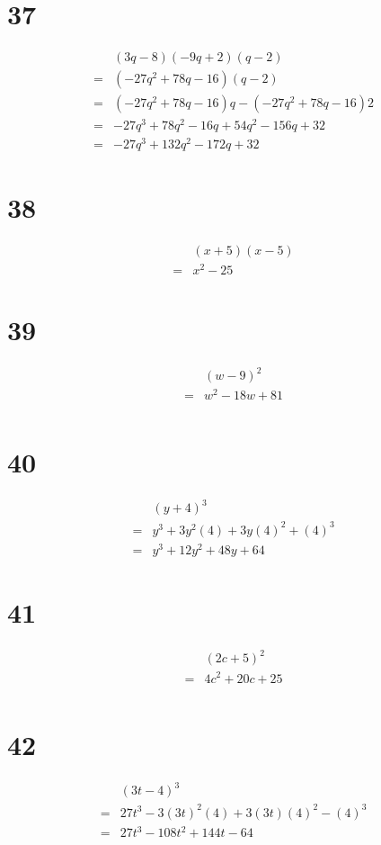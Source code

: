 \documentclass{article}
\theoremstyle{definition}
\begin{document}
\section*{37}
\[
\begin{array}{rl}
	& (3q-8)(-9q+2)(q-2) \\
=	& (-27q^2+78q-16)(q-2) \\
=	& (-27q^2+78q-16)q-(-27q^2+78q-16)2 \\
=	& -27q^3+78q^2-16q+54q^2-156q+32 \\
=	& -27q^3+132q^2-172q+32
\end{array}
\]

\section*{38}
\[
\begin{array}{rl}
	& (x+5)(x-5) \\
=	& x^2-25
\end{array}
\]

\section*{39}
\[
\begin{array}{rl}
	& (w-9)^2 \\
=	& w^2-18w+81 \\
\end{array}
\]

\section*{40}
\[
\begin{array}{rl}
	& (y+4)^3 \\
=	& y^3+3y^2(4)+3y(4)^2+(4)^3 \\
=	& y^3+12y^2+48y+64
\end{array}
\]

\section*{41}
\[
\begin{array}{rl}
	& (2c+5)^2 \\
=	& 4c^2+20c+25 \\
\end{array}
\]

\section*{42}
\[
\begin{array}{rl}
	& (3t-4)^3 \\
=	& 27t^3-3(3t)^2(4)+3(3t)(4)^2-(4)^3 \\
=	& 27t^3-108t^2+144t-64 \\
\end{array}
\]
\end{document}
